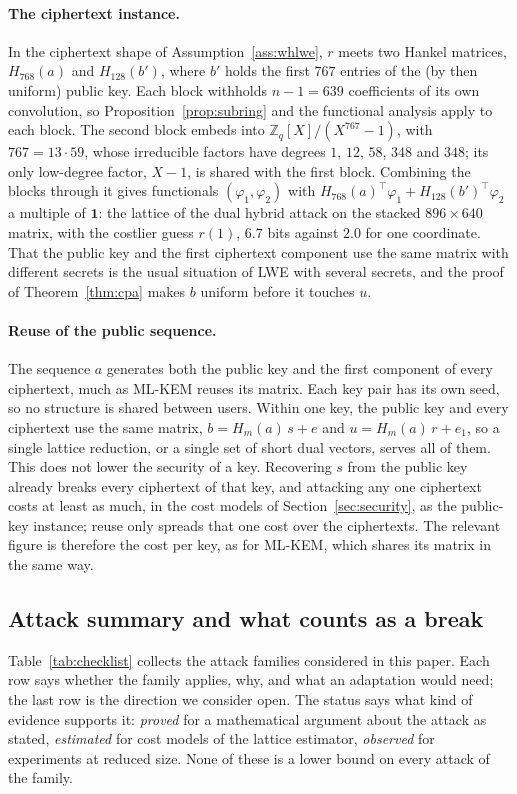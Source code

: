 \documentclass[11pt,a4paper]{article}
\theoremstyle{definition}
\newcommand{\Zq}{\mathbb{Z}_q}
\begin{document}
\paragraph{The ciphertext instance.} In the ciphertext shape of Assumption~\ref{ass:whlwe}, $r$ meets two Hankel matrices, $H_{768}(a)$ and $H_{128}(b')$, where $b'$ holds the first $767$ entries of the (by then uniform) public key. Each block withholds $n - 1 = 639$ coefficients of its own convolution, so Proposition~\ref{prop:subring} and the functional analysis apply to each block. The second block embeds into $\Zq[X]/(X^{767} - 1)$, with $767 = 13 \cdot 59$, whose irreducible factors have degrees $1$, $12$, $58$, $348$ and $348$; its only low-degree factor, $X - 1$, is shared with the first block. Combining the blocks through it gives functionals $(\varphi_1, \varphi_2)$ with $H_{768}(a)^{\top}\varphi_1 + H_{128}(b')^{\top}\varphi_2$ a multiple of $\mathbf{1}$: the lattice of the dual hybrid attack on the stacked $896 \times 640$ matrix, with the costlier guess $r(1)$, $6.7$ bits against $2.0$ for one coordinate. That the public key and the first ciphertext component use the same matrix with different secrets is the usual situation of LWE with several secrets, and the proof of Theorem~\ref{thm:cpa} makes $b$ uniform before it touches $u$.

\paragraph{Reuse of the public sequence.} The sequence $a$ generates both the public key and the first component of every ciphertext, much as ML-KEM reuses its matrix. Each key pair has its own seed, so no structure is shared between users. Within one key, the public key and every ciphertext use the same matrix, $b = H_m(a)\,s + e$ and $u = H_m(a)\,r + e_1$, so a single lattice reduction, or a single set of short dual vectors, serves all of them. This does not lower the security of a key. Recovering $s$ from the public key already breaks every ciphertext of that key, and attacking any one ciphertext costs at least as much, in the cost models of Section~\ref{sec:security}, as the public-key instance; reuse only spreads that one cost over the ciphertexts. The relevant figure is therefore the cost per key, as for ML-KEM, which shares its matrix in the same way.

\subsection{Attack summary and what counts as a break}\label{sec:checklist}
Table~\ref{tab:checklist} collects the attack families considered in this paper. Each row says whether the family applies, why, and what an adaptation would need; the last row is the direction we consider open. The status says what kind of evidence supports it: \emph{proved} for a mathematical argument about the attack as stated, \emph{estimated} for cost models of the lattice estimator, \emph{observed} for experiments at reduced size. None of these is a lower bound on every attack of the family.
\end{document}
